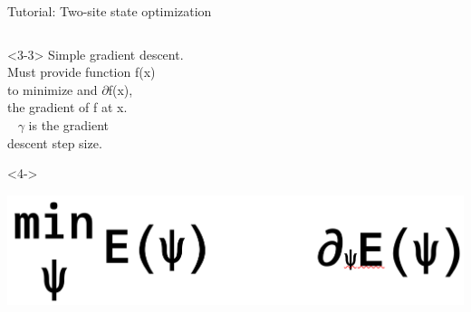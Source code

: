 \begin{frame}[fragile]{Tutorial: Two-site state optimization}
\begin{columns}
\begin{column}{5cm}
\begin{onlyenv}<3-3>
Simple gradient descent. \\
Must provide function f(x) \\
to minimize and $\partial$f(x), \\
the gradient of f at x. \\
~
$\gamma$ is the gradient \\
descent step size. \\
\end{onlyenv}

\begin{onlyenv}<4->
\vspace*{0.0cm}
\begin{center}
\includegraphics[width=1.0\textwidth]{
  slides/assets/min_grad_E_psi.png
}
\end{center}
\vspace*{0.0cm}
\end{onlyenv}

\end{column}

\end{columns}

\end{frame}
